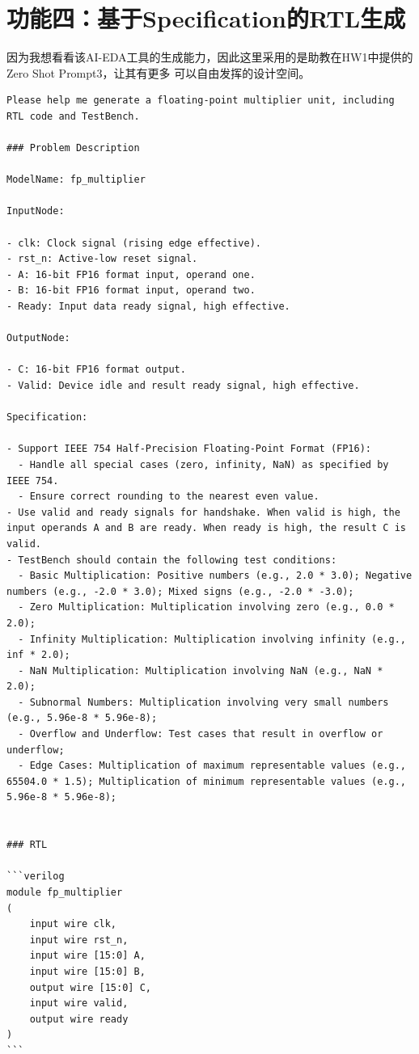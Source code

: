 \documentclass[UTF8]{ctexart}
\begin{document}
\section{功能四：基于Specification的RTL生成}
因为我想看看该AI-EDA工具的生成能力，因此这里采用的是助教在HW1中提供的Zero Shot Prompt3，让其有更多
可以自由发挥的设计空间。
\begin{lstlisting}[frame=shadowbox]
Please help me generate a floating-point multiplier unit, including RTL code and TestBench. 

### Problem Description

ModelName: fp_multiplier

InputNode:

- clk: Clock signal (rising edge effective).
- rst_n: Active-low reset signal.
- A: 16-bit FP16 format input, operand one.
- B: 16-bit FP16 format input, operand two.
- Ready: Input data ready signal, high effective.

OutputNode:

- C: 16-bit FP16 format output.
- Valid: Device idle and result ready signal, high effective.

Specification:

- Support IEEE 754 Half-Precision Floating-Point Format (FP16):
  - Handle all special cases (zero, infinity, NaN) as specified by IEEE 754.
  - Ensure correct rounding to the nearest even value.
- Use valid and ready signals for handshake. When valid is high, the input operands A and B are ready. When ready is high, the result C is valid.
- TestBench should contain the following test conditions:
  - Basic Multiplication: Positive numbers (e.g., 2.0 * 3.0); Negative numbers (e.g., -2.0 * 3.0); Mixed signs (e.g., -2.0 * -3.0);
  - Zero Multiplication: Multiplication involving zero (e.g., 0.0 * 2.0);
  - Infinity Multiplication: Multiplication involving infinity (e.g., inf * 2.0);
  - NaN Multiplication: Multiplication involving NaN (e.g., NaN * 2.0);
  - Subnormal Numbers: Multiplication involving very small numbers (e.g., 5.96e-8 * 5.96e-8);
  - Overflow and Underflow: Test cases that result in overflow or underflow;
  - Edge Cases: Multiplication of maximum representable values (e.g., 65504.0 * 1.5); Multiplication of minimum representable values (e.g., 5.96e-8 * 5.96e-8);


### RTL

```verilog
module fp_multiplier
(
    input wire clk,
    input wire rst_n,
    input wire [15:0] A,
    input wire [15:0] B,
    output wire [15:0] C,
    input wire valid,
    output wire ready
)
```


\end{lstlisting}
\end{document}
